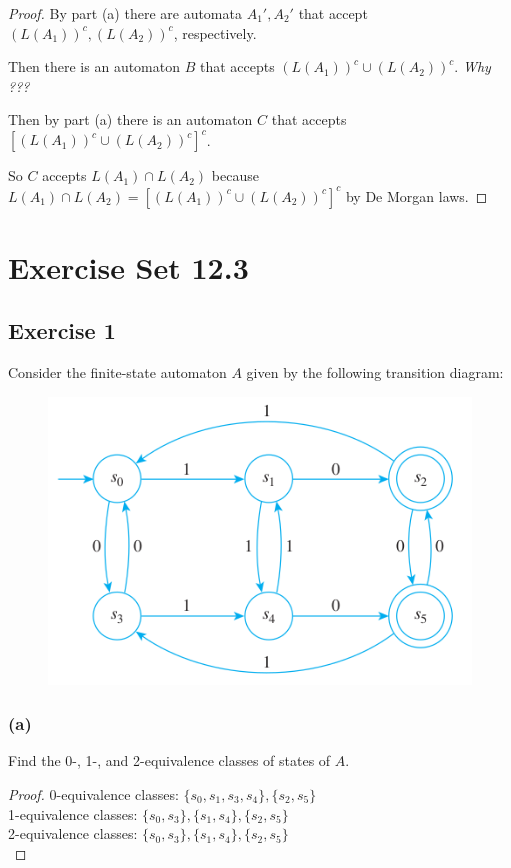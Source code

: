 \documentclass[14pt]{extarticle}
\begin{document}
\begin{proof}
By part (a) there are automata \(A_1', A_2'\) that accept \((L(A_1))^c, (L(A_2))^c\), respectively.

Then there is an automaton \(B\) that accepts \((L(A_1))^c \cup (L(A_2))^c\). {\it Why ???}

Then by part (a) there is an automaton \(C\) that accepts 
\([(L(A_1))^c \cup (L(A_2))^c]^c\).

So \(C\) accepts \(L(A_1) \cap L(A_2)\) because \(L(A_1) \cap L(A_2) = [(L(A_1))^c \cup (L(A_2))^c]^c\) by De Morgan laws.
\end{proof}

\section{Exercise Set 12.3}
\subsection{Exercise 1}
Consider the finite-state automaton \(A\) given by the following transition diagram:

\begin{figure}[ht!]
\centering
\includegraphics[scale=0.5]{../images/12.3.1.png}
\end{figure}

\subsubsection{(a)}
Find the 0-, 1-, and 2-equivalence classes of states of \(A\).

\begin{proof}
0-equivalence classes: \(\{s_0, s_1, s_3, s_4\}, \{s_2, s_5\}\) \\
1-equivalence classes: \(\{s_0, s_3\}, \{s_1, s_4\}, \{s_2, s_5\}\) \\
2-equivalence classes: \(\{s_0, s_3\}, \{s_1, s_4\}, \{s_2, s_5\}\) \\
\end{proof}
\end{document}
